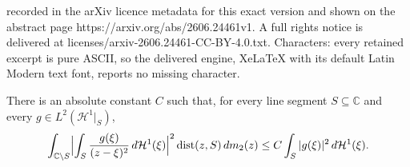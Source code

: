 \documentclass[10pt,a4paper]{amsart}
\DeclareMathOperator{\dist}{dist}
\DeclarePairedDelimiter{\abs}{\lvert}{\rvert}
\newcommand{\CC}[0]{\mathbb{C}}
\newcommand{\hd}[1]{\mathcal{H}^{#1}}
\renewcommand{\restriction}{\big|}
\renewcommand{\subset}{\subseteq}
\begin{document}
recorded in the arXiv licence metadata for this exact version and shown on the abstract page https://arxiv.org/abs/2606.24461v1. A full rights notice is delivered at licenses/arxiv-2606.24461-CC-BY-4.0.txt. Characters: every retained excerpt is pure ASCII, so the delivered engine, XeLaTeX with its default Latin Modern text font, reports no missing character.
\begin{lemma}
  There is an absolute constant $C$ such that, for every line segment $S\subset\CC$ and every $g\in L^2(\hd1\restriction_S)$,
  \begin{align}\label{eq:segment-usfe-appendix}
    \int_{\CC\setminus S}
    \abs[\Big]{\int_S \frac{g(\xi)}{(z-\xi)^2}\,d\hd1(\xi)}^2
    \dist(z,S)\,dm_2(z)
    \le C\int_S |g(\xi)|^2\,d\hd1(\xi) .
  \end{align}
\end{lemma}
\end{document}
